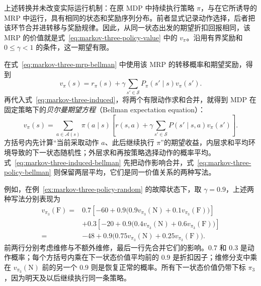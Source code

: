 \documentclass[UTF8,12pt,a4paper,fontset=fandol]{ctexart}
\begin{document}
上述转换并未改变实际运行机制：在原 MDP 中持续执行策略 $\pi$，与在它所诱导的 MRP 中运行，具有相同的状态和奖励序列分布。前者显式记录动作选择，后者把该环节合并进转移与奖励规律。因此，从同一状态出发的期望折扣回报相同，该 MRP 的价值就是式~\eqref{eq:markov-three-policy-value} 中的 $v_\pi$。沿用有界奖励和 $0\leq\gamma<1$ 的条件，这一期望有限。

在式~\eqref{eq:markov-three-mrp-bellman} 中使用该 MRP 的转移概率和期望奖励，得到
\begin{equation}
  v_\pi(s)=r_\pi(s)+\gamma\sum_{s'\in\mathcal S}P_\pi(s'\mid s)v_\pi(s').
  \label{eq:markov-three-induced-bellman}
\end{equation}
再代入式~\eqref{eq:markov-three-induced}，将两个有限动作求和合并，就得到 MDP 在固定策略下的\emph{贝尔曼期望方程}（Bellman expectation equation）：
\begin{equation}
  v_\pi(s)=\sum_{a\in\mathcal A(s)}\pi(a\mid s)
  \left[r(s,a)+\gamma\sum_{s'\in\mathcal S}P(s'\mid s,a)v_\pi(s')\right].
  \label{eq:markov-three-policy-bellman}
\end{equation}
方括号内先计算“当前采取动作 $a$、此后继续执行 $\pi$”的期望收益，内层求和平均环境导致的下一状态随机性；外层求和再按策略选择动作的概率平均。式~\eqref{eq:markov-three-induced-bellman} 先把动作影响合并，式~\eqref{eq:markov-three-policy-bellman} 则保留两层平均，它们是同一价值关系的两种写法。

例如，在例~\ref{ex:markov-three-policy-random} 的故障状态下，取 $\gamma=0.9$，上述两种写法分别表现为
\begin{equation}
  \begin{aligned}
    v_{\pi_3}(\mathrm F)
      ={}&0.7\left[-60+0.9\bigl(0.9v_{\pi_3}(\mathrm N)+0.1v_{\pi_3}(\mathrm F)\bigr)\right]\\
         &+0.3\left[-20+0.9\bigl(0.4v_{\pi_3}(\mathrm N)+0.6v_{\pi_3}(\mathrm F)\bigr)\right]\\
      ={}&-48+0.9\bigl(0.75v_{\pi_3}(\mathrm N)+0.25v_{\pi_3}(\mathrm F)\bigr).
  \end{aligned}
  \label{eq:markov-three-random-bellman}
\end{equation}
前两行分别考虑维修与不额外维修，最后一行先合并它们的影响。$0.7$ 和 $0.3$ 是动作概率；每个方括号内乘在下一状态价值平均前的 $0.9$ 是折扣因子；维修分支中乘在 $v_{\pi_3}(\mathrm N)$ 前的另一个 $0.9$ 则是恢复正常的概率。所有下一状态价值仍带下标 $\pi_3$，因为明天及以后继续执行同一条策略。
\end{document}
